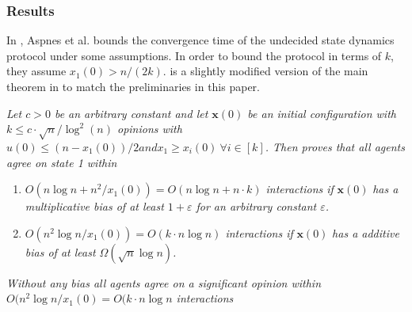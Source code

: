 \subsubsection{Results}

In \cite{AspnesFastConverganceOfKOpinion2023}, Aspnes et al. bounds the convergence time of the undecided state dynamics protocol under some assumptions. In order to bound the protocol in terms of $k$, they assume $x_1(0) > n/(2k)$.  is a slightly modified version of the main theorem in \cite{AspnesFastConverganceOfKOpinion2023} to match the preliminaries in this paper.

 \begin{theorem}
    \textit{Let $c > 0$ be an arbitrary constant and let $\textbf{x}(0)$ be an initial configuration with $k \leq c \cdot \sqrt{n}/\log^2(n) $ opinions with $u(0) \leq (n - x_1(0))/2 and x_1 \geq x_i(0) \ \forall i \in [k]$. Then \cite{AspnesFastConverganceOfKOpinion2023} proves that all agents agree on state 1 within}

    \begin{enumerate}
        \item \textit{$O(n \log n + n^2 / x_1(0)) = O(n \log n + n \cdot k)$ interactions if }$\textbf{x}(0)$ \textit{has a multiplicative bias  of at least $1 + \varepsilon$ for an arbitrary constant $\varepsilon$.}
        \item \textit{$O(n^2 \log n/x_1(0)) = O(k \cdot n \log n)$ interactions if} $\textbf{x}(0)$ \textit{has a additive bias  of at least $\Omega(\sqrt{n} \log n)$.}
    \end{enumerate}

    \textit{Without any bias all agents agree on a significant opinion within $O(n^2 \log n / x_1(0) = O(k \cdot n \log n$ interactions}
 \end{theorem} 



\clearpage